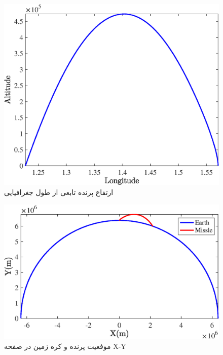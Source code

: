 \begin{figure}[H]
	\centering
	\includegraphics[width=.75\linewidth]{../Figure/Q1/d/lat_vs_alt}
	\caption{ارتفاع پرنده تابعی از طول جغرافیایی}
\end{figure}

\begin{figure}[H]
	\centering
	\includegraphics[width=.75\linewidth]{../Figure/Q1/d/xy_earth}
	\caption{موفعیت پرنده و کره زمین در صفحه X-Y}
\end{figure}

